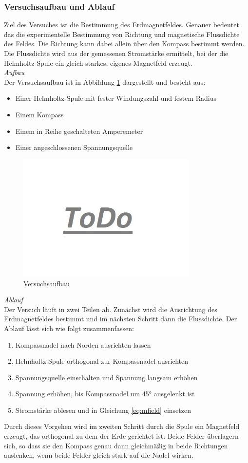 \subsubsection{Versuchsaufbau und Ablauf}
Ziel des Versuches ist die Bestimmung des Erdmagnetfeldes. Genauer bedeutet das die experimentelle Bestimmung von Richtung und magnetische Flussdichte des Feldes. Die Richtung kann dabei allein über den Kompass bestimmt werden. Die Flussdichte wird aus der gemessenen Stromstärke ermittelt, bei der die Helmholtz-Spule ein gleich starkes, eigenes Magnetfeld erzeugt.\\

\textit{Aufbau}\\
Der Versuchsaufbau ist in Abbildung \ref{img:experiment-devices} dargestellt und besteht aus: 
\begin{itemize}
	\setlength{\itemsep}{-5pt}
	\item Einer Helmholtz-Spule mit fester Windungszahl und festem Radius
	\item Einem Kompass
	\item Einem in Reihe geschalteten Amperemeter
	\item Einer angeschlossenen Spannungsquelle
\end{itemize}

\begin{figure}[h!]
	\centering
	\includegraphics[width=0.8\textwidth]{images/todo.jpg}
	\caption{Versuchsaufbau}
	\label{img:experiment-devices}
\end{figure}

\textit{Ablauf}\\
Der Versuch läuft in zwei Teilen ab. Zunächst wird die Ausrichtung des Erdmagnetfeldes bestimmt und im nächsten Schritt dann die Flussdichte. Der Ablauf lässt sich wie folgt zusammenfassen:
\begin{enumerate}
	\setlength{\itemsep}{-2pt}
	\item Kompassnadel nach Norden ausrichten lassen
	\item Helmholtz-Spule orthogonal zur Kompassnadel ausrichten
	\item Spannungsquelle einschalten und Spannung langsam erhöhen
	\item Spannung erhöhen, bis Kompassnadel um 45° ausgelenkt ist
	\item Stromstärke ablesen und in Gleichung \eqref{eq:mfield} einsetzen
\end{enumerate}

Durch dieses Vorgehen wird im zweiten Schritt durch die Spule ein Magnetfeld erzeugt, das orthogonal zu dem der Erde gerichtet ist. Beide Felder überlagern sich, so dass sie den Kompass genau dann gleichmäßig in beide Richtungen auslenken, wenn beide Felder gleich stark auf die Nadel wirken.